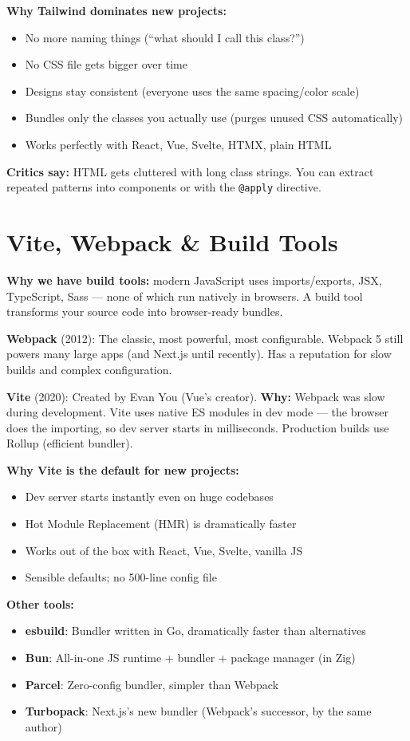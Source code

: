 \documentclass[11pt, letterpaper]{article}
\begin{document}
\textbf{Why Tailwind dominates new projects:}
\begin{itemize}[noitemsep]
  \item No more naming things (``what should I call this class?'')
  \item No CSS file gets bigger over time
  \item Designs stay consistent (everyone uses the same spacing/color scale)
  \item Bundles only the classes you actually use (purges unused CSS automatically)
  \item Works perfectly with React, Vue, Svelte, HTMX, plain HTML
\end{itemize}

\textbf{Critics say:} HTML gets cluttered with long class strings. You can extract repeated patterns into components or with the \texttt{@apply} directive.

\section*{Vite, Webpack \& Build Tools}

\textbf{Why we have build tools:} modern JavaScript uses imports/exports, JSX, TypeScript, Sass --- none of which run natively in browsers. A build tool transforms your source code into browser-ready bundles.

\textbf{Webpack} (2012): The classic, most powerful, most configurable. Webpack 5 still powers many large apps (and Next.js until recently). Has a reputation for slow builds and complex configuration.

\textbf{Vite} (2020): Created by Evan You (Vue's creator). \textbf{Why:} Webpack was slow during development. Vite uses native ES modules in dev mode --- the browser does the importing, so dev server starts in milliseconds. Production builds use Rollup (efficient bundler).

\textbf{Why Vite is the default for new projects:}
\begin{itemize}[noitemsep]
  \item Dev server starts instantly even on huge codebases
  \item Hot Module Replacement (HMR) is dramatically faster
  \item Works out of the box with React, Vue, Svelte, vanilla JS
  \item Sensible defaults; no 500-line config file
\end{itemize}

\textbf{Other tools:}
\begin{itemize}[noitemsep]
  \item \textbf{esbuild}: Bundler written in Go, dramatically faster than alternatives
  \item \textbf{Bun}: All-in-one JS runtime + bundler + package manager (in Zig)
  \item \textbf{Parcel}: Zero-config bundler, simpler than Webpack
  \item \textbf{Turbopack}: Next.js's new bundler (Webpack's successor, by the same author)
\end{itemize}
\end{document}
